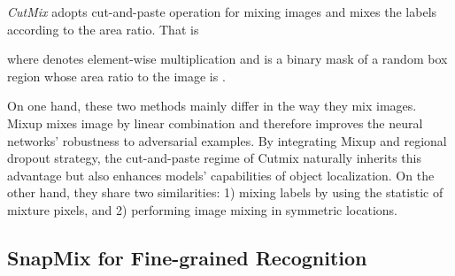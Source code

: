 \documentclass[letterpaper]{article} \usepackage{aaai21}  \usepackage{times}  \usepackage{helvet} \usepackage{courier}  \usepackage[hyphens]{url}  \usepackage{graphicx} \urlstyle{rm} \def\UrlFont{\rm}  \usepackage{natbib}  \usepackage{caption} \frenchspacing  \setlength{\pdfpagewidth}{8.5in}  \setlength{\pdfpageheight}{11in}
\begin{document}
\textit{CutMix} adopts cut-and-paste operation for mixing images and mixes the labels according to the area ratio. That is


where  denotes element-wise multiplication and  is a binary mask of a random box region whose area ratio to the image is .

On one hand, these two methods mainly differ in the way they mix images.  Mixup mixes image by linear combination and therefore improves the neural networks' robustness to adversarial examples. By integrating Mixup and regional dropout strategy, the cut-and-paste regime of Cutmix naturally inherits this advantage but also enhances models' capabilities of object localization.  On the other hand, they share two similarities: 1) mixing labels by using the statistic of mixture pixels, and 2) performing image mixing in symmetric locations.

\iffalse
Now, we can give a general form of calculating they label weights for both Mixup and Cutmix, which is defined as

By substituting Eq.\ref{eq:mixup} and Eq.\ref{eq:cutmix} into Eq.\ref{eq:weight}  respectively, our definitions obtain consistent results both with Mixup and CutMix. Also, the formulation shows that both Mixup and Cutmix compute the label weights only based on the statistics of mixture pixels.
\fi

\subsection{SnapMix for Fine-grained Recognition}
\end{document}
